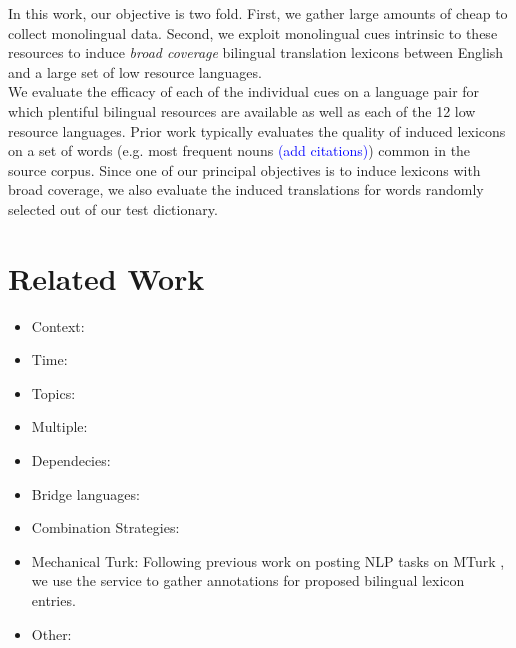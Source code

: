 \documentclass{article}
\newcommand{\todo}[1]{\textcolor{blue}{(#1)}}
\begin{document}
In this work, our objective is two fold.  First, we gather large amounts of cheap to collect  monolingual data.  Second, we exploit monolingual cues intrinsic to these resources to  induce {\em broad coverage} bilingual translation lexicons between English and a large  set of low resource languages.  \\

We evaluate the efficacy of each of the individual cues on a language pair for which plentiful  bilingual resources are available as well as each of the 12 low resource languages. Prior work typically evaluates the quality of induced lexicons on a set of words (e.g. most frequent  nouns \cite{Rapp:1999} \todo{add citations}) common in the source corpus.  Since one of our  principal objectives is to induce lexicons with broad coverage, we also evaluate the induced  translations for words randomly selected out of our test dictionary.  


\section{Related Work} \label{sect:relwork}

\begin{itemize}
\setlength{\parskip}{0pt}
  \item Context: \cite{Rapp:1995,Rapp:1999,Fung:1998}
  \item Time: \cite{Schafer:2002,Klementiev:2006b}
  \item Topics: \cite{Mimno:2009,Boyd-Graber:2009}
  \item Multiple: \cite{Schafer:2002,Koehn:2000,Haghighi:2008}
  \item Dependecies: \cite{Garera:2009}
  \item Bridge languages: \cite{Mann:2001}
  \item Combination Strategies: \cite{Koehn:2000,Klementiev:2006b,Klementiev:2008a}
  \item Mechanical Turk: Following previous work on posting NLP tasks on MTurk \cite{Snow:2008,CCB:2009}, we use the service to gather annotations for proposed bilingual lexicon entries. 
  \item Other: \cite{Monz:2005}
\end{itemize}
\end{document}
